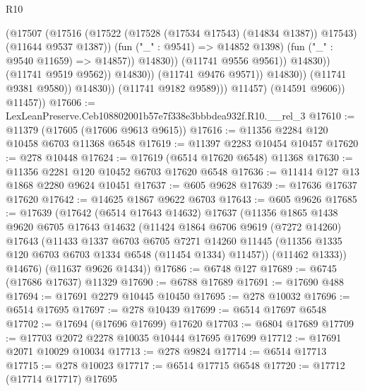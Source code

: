 \begin{lexlean}{R10}
\begin{coremodule}
                                            (@17507
                                              (@17516
                                                (@17522
                                                  (@17528 (@17534 @17543) (@14834 @1387))
                                                  @17543)
                                                (@11644 @9537 @1387))
                                              (fun ("_" : @9541) => @14852 @1398)
                                              (fun ("_" : @9540 @11659) => @14857))
                                            @14830))
                                        (@11741 @9556 @9561))
                                      @14830))
                                  (@11741 @9519 @9562))
                                @14830))
                            (@11741 @9476 @9571))
                          @14830))
                      (@11741 @9381 @9580))
                    @14830))
                (@11741 @9182 @9589)))
            @11457)
          (@14591 @9606))
        @11457))
@17606 := LexLeanPreserve.Ceb108802001b57e7f338e3bbbdea932f.R10.__rel_3
@17610 := @11379 (@17605 (@17606 @9613 @9615))
@17616 := @11356 @2284 @120 @10458 @6703 @11368 @6548
@17619 := @11397 @2283 @10454 @10457
@17620 := @278 @10448
@17624 := @17619 (@6514 @17620 @6548) @11368
@17630 := @11356 @2281 @120 @10452 @6703 @17620 @6548
@17636 := @11414 @127 @13 @1868 @2280 @9624 @10451
@17637 := @605 @9628
@17639 := @17636 @17637 @17620
@17642 := @14625 @1867 @9622 @6703
@17643 := @605 @9626
@17685 := @17639
    (@17642
      (@6514 @17643 @14632)
      @17637
      (@11356
        @1865
        @1438
        @9620
        @6705
        @17643
        @14632
        (@11424
          @1864
          @6706
          @9619
          (@7272 @14260)
          @17643
          (@11433
            @1337
            @6703
            @6705
            @7271
            @14260
            @11445
            (@11356 @1335 @120 @6703 @6703 @1334 @6548 (@11454 @1334) @11457))
          (@11462 @1333))
        @14676)
      (@11637 @9626 @1434))
@17686 := @6748 @127
@17689 := @6745 (@17686 @17637) @11329
@17690 := @6788 @17689
@17691 := @17690 @488
@17694 := @17691 @2279 @10445 @10450
@17695 := @278 @10032
@17696 := @6514 @17695
@17697 := @278 @10439
@17699 := @6514 @17697 @6548
@17702 := @17694 (@17696 @17699) @17620
@17703 := @6804 @17689
@17709 := @17703 @2072 @2278 @10035 @10444 @17695 @17699
@17712 := @17691 @2071 @10029 @10034
@17713 := @278 @9824
@17714 := @6514 @17713
@17715 := @278 @10023
@17717 := @6514 @17715 @6548
@17720 := @17712 (@17714 @17717) @17695

\end{coremodule}
\end{lexlean}
